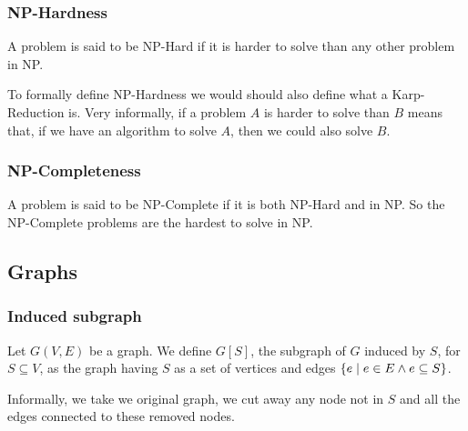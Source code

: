     \subsubsection{NP-Hardness}
        A problem is said to be NP-Hard if it is harder to solve than any other problem in NP.

        To formally define NP-Hardness we would should also define what a Karp-Reduction is.
        Very informally, if a problem $A$ is harder to solve than $B$ means that, if we have an algorithm to solve $A$, then we could also solve $B$.

    \subsubsection{NP-Completeness}
        A problem is said to be NP-Complete if it is both NP-Hard and in NP.
        So the NP-Complete problems are the hardest to solve in NP.


\subsection{Graphs}

    \subsubsection{Induced subgraph}\label{subsubsec:induced_subgraph}
        Let $G(V,E)$ be a graph. We define $G[S]$, the subgraph of $G$ induced by $S$, for $S \subseteq V$, as the graph having $S$ as a set of vertices and edges $\{ e \; \vert \; e \in E \wedge e \subseteq S \}$.

        Informally, we take we original graph, we cut away any node not in $S$ and all the edges connected to these removed nodes.